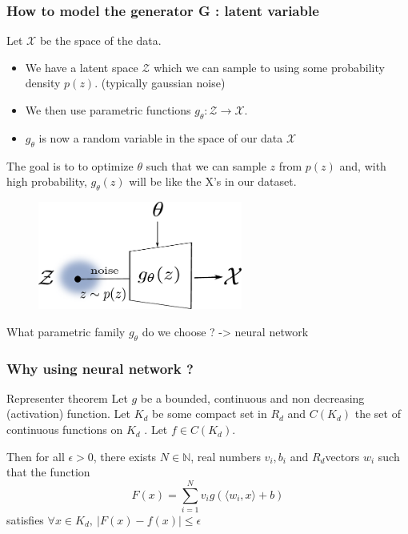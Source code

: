 \documentclass[french,9pt]{beamer}
\begin{document}
\begin{frame}
\frametitle{How to model the generator G : latent variable }

Let $\mathcal{X}$ be the space of the data. 
\begin{itemize}
\item We have a latent space $\mathcal{Z}$ which we can sample to using some probability density $p(z)$. (typically gaussian noise)
\item  We then use parametric functions $g_{\theta} : \mathcal{Z} \rightarrow \mathcal{X}$.  
\item $g_{\theta}$ is now a random variable in the space of our data $\mathcal{X}$
\end{itemize}

The goal is to to optimize $\theta$ such that we can sample $z$ from $p(z)$ and, with high probability, $g_{\theta}(z)$ will be like the X’s in our dataset.

\begin{figure}
  \begin{center}
    \includegraphics[width=0.6\textwidth]{fig/latent.pdf}
  \end{center}
\end{figure}

\pause 
What parametric family $g_{\theta}$ do we choose ? -> neural network

\end{frame}


\begin{frame}
\frametitle{Why using neural network ?}

\begin{block}{Representer theorem}
Let $g$ be a bounded, continuous and non decreasing (activation) function. Let $K_{d}$ be some compact set in $R_{d}$ and $C(K_{d})$ the set of continuous functions on $K_{d}$ . Let $f \in C(K_{d})$. 

Then for all $\epsilon > 0$, there exists $N \in \mathbb{N}$, real numbers $v_{i}, b_{i}$ and $R_{d}$vectors $w_{i}$ such that the function
$$F(x) = \sum_{i=1}^{N} v_{i} g( \langle w_{i},x\rangle  +b)$$
satisfies
$\forall x \in K_{d}, \ | F(x) - f(x) | \leq \epsilon$

\end{block}
\end{frame}
\end{document}
